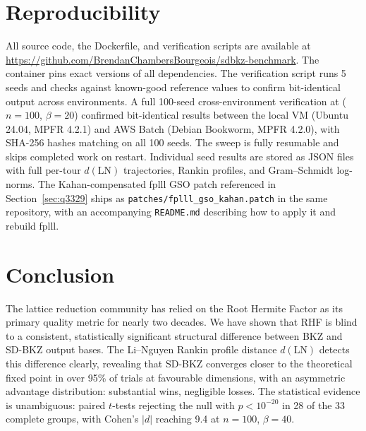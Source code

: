 \documentclass[journal=cic,version=preprint]{iacrj}
\begin{document}
\section{Reproducibility}
\label{sec:repro}

All source code, the Dockerfile, and verification scripts are available at \url{https://github.com/BrendanChambersBourgeois/sdbkz-benchmark}. The container pins exact versions of all dependencies. The verification script runs 5 seeds and checks against known-good reference values to confirm bit-identical output across environments. A full 100-seed cross-environment verification at ($n=100$, $\beta=20$) confirmed bit-identical results between the local VM (Ubuntu 24.04, MPFR 4.2.1) and AWS Batch (Debian Bookworm, MPFR 4.2.0), with SHA-256 hashes matching on all 100 seeds. The sweep is fully resumable and skips completed work on restart. Individual seed results are stored as JSON files with full per-tour $d(\mathrm{LN})$ trajectories, Rankin profiles, and Gram--Schmidt log-norms. The Kahan-compensated fplll GSO patch referenced in Section~\ref{sec:q3329} ships as \texttt{patches/fplll\_gso\_kahan.patch} in the same repository, with an accompanying \texttt{README.md} describing how to apply it and rebuild fplll.

\section{Conclusion}
\label{sec:conclusion}

The lattice reduction community has relied on the Root Hermite Factor as its primary quality metric for nearly two decades. We have shown that RHF is blind to a consistent, statistically significant structural difference between BKZ and SD-BKZ output bases. The Li--Nguyen Rankin profile distance $d(\mathrm{LN})$ detects this difference clearly, revealing that SD-BKZ converges closer to the theoretical fixed point in over 95\% of trials at favourable dimensions, with an asymmetric advantage distribution: substantial wins, negligible losses. The statistical evidence is unambiguous: paired $t$-tests rejecting the null with $p<10^{-20}$ in 28 of the 33 complete groups, with Cohen's $|d|$ reaching 9.4 at $n=100$, $\beta=40$.
\end{document}
